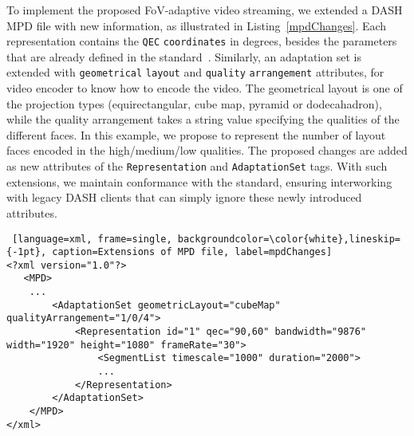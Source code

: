  To implement the proposed
\ac{FoV}-adaptive video streaming, we extended a \ac{DASH} \ac{MPD}
file with new information, as illustrated in Listing~\ref{mpdChanges}.
Each representation contains the \texttt{\ac{QEC}}
\texttt{coordinates} in degrees, besides the parameters that are
already defined in the standard~\cite{iso_iec}. Similarly, an
adaptation set is extended with \texttt{geometrical} \texttt{layout}
and \texttt{quality} \texttt{arrangement} attributes, for video
encoder to know how to encode the video. The geometrical layout is one
of the projection types (equirectangular, cube map, pyramid or
dodecahadron), while the quality arrangement takes a string value
specifying the qualities of the different faces. In this example, we
propose to represent the number of layout faces encoded in the
high/medium/low qualities. The proposed changes are added as new
attributes of the \texttt{Representation} and \texttt{AdaptationSet}
tags. With such extensions, we maintain conformance with the standard,
ensuring interworking with legacy \ac{DASH} clients that can simply
ignore these newly introduced attributes.

\begin{minipage}{\linewidth}
\begin {lstlisting} [language=xml, frame=single, backgroundcolor=\color{white},lineskip={-1pt}, caption=Extensions of MPD file, label=mpdChanges]
<?xml version="1.0"?>
   <MPD>
    ...
        <AdaptationSet geometricLayout="cubeMap" qualityArrangement="1/0/4">
            <Representation id="1" qec="90,60" bandwidth="9876" width="1920" height="1080" frameRate="30">
                <SegmentList timescale="1000" duration="2000">
                ...
            </Representation>
        </AdaptationSet>
    </MPD>
</xml>
\end{lstlisting}
\end{minipage}




